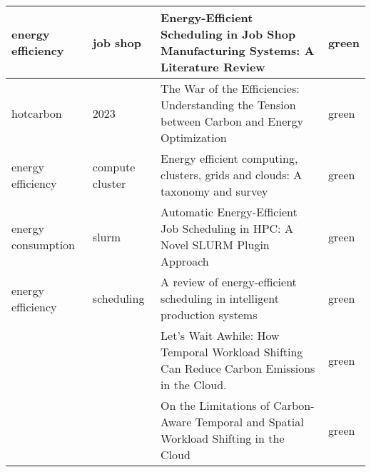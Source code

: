 \begin{sidewaystable}
\begin{tabular}{p{3.5cm}|p{3cm}|p{11cm}|p{1.5cm}}
    energy efficiency  & job shop        & Energy-Efficient Scheduling in Job Shop Manufacturing Systems: A Literature Review                                                                                      & green    \\ \hline
    hotcarbon          & 2023            & The War of the Efficiencies: Understanding the Tension between Carbon and Energy Optimization                                                                           & green    \\ \hline
    energy efficiency  & compute cluster & Energy efficient computing, clusters, grids and clouds: A taxonomy and survey                                                                                           & green    \\ \hline
    energy consumption & slurm           & Automatic Energy-Efficient Job Scheduling in HPC: A Novel SLURM Plugin Approach                                                                                         & green    \\ \hline
    energy efficiency  & scheduling      & A review of energy-efficient scheduling in intelligent production systems                                                                                               & green    \\ \hline
                       &                 & Let’s Wait Awhile: How Temporal Workload Shifting Can Reduce Carbon Emissions in the Cloud.                                                                             & green    \\ \hline
                       &                 & On the Limitations of Carbon-Aware Temporal and Spatial Workload Shifting in the Cloud                                                                                  & green    \\ \hline
    \end{tabular}
\end{sidewaystable}
